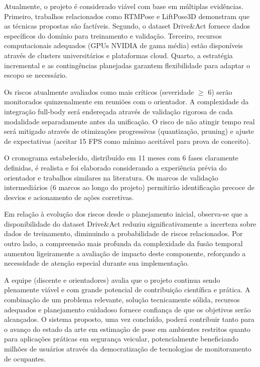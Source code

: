 \documentclass[12pt, a4paper]{article}
\begin{document}
Atualmente, o projeto é considerado viável com base em múltiplas evidências. Primeiro, trabalhos relacionados como RTMPose e LiftPose3D demonstram que as técnicas propostas são factíveis. Segundo, o dataset Drive\&Act fornece dados específicos do domínio para treinamento e validação. Terceiro, recursos computacionais adequados (GPUs NVIDIA de gama média) estão disponíveis através de clusters universitários e plataformas cloud. Quarto, a estratégia incremental e as contingências planejadas garantem flexibilidade para adaptar o escopo se necessário.

Os riscos atualmente avaliados como mais críticos (severidade $\geq$ 6) serão monitorados quinzenalmente em reuniões com o orientador. A complexidade da integração full-body será endereçada através de validação rigorosa de cada modalidade separadamente antes da unificação. O risco de não atingir tempo real será mitigado através de otimizações progressivas (quantização, pruning) e ajuste de expectativas (aceitar 15 FPS como mínimo aceitável para prova de conceito).

O cronograma estabelecido, distribuído em 11 meses com 6 fases claramente definidas, é realista e foi elaborado considerando a experiência prévia do orientador e trabalhos similares na literatura. Os marcos de validação intermediários (6 marcos ao longo do projeto) permitirão identificação precoce de desvios e acionamento de ações corretivas.

Em relação à evolução dos riscos desde o planejamento inicial, observa-se que a disponibilidade do dataset Drive\&Act reduziu significativamente a incerteza sobre dados de treinamento, diminuindo a probabilidade de riscos relacionados. Por outro lado, a compreensão mais profunda da complexidade da fusão temporal aumentou ligeiramente a avaliação de impacto deste componente, reforçando a necessidade de atenção especial durante sua implementação.

A equipe (discente e orientadores) avalia que o projeto continua sendo plenamente viável e com grande potencial de contribuição científica e prática. A combinação de um problema relevante, solução tecnicamente sólida, recursos adequados e planejamento cuidadoso fornece confiança de que os objetivos serão alcançados. O sistema proposto, uma vez concluído, poderá contribuir tanto para o avanço do estado da arte em estimação de pose em ambientes restritos quanto para aplicações práticas em segurança veicular, potencialmente beneficiando milhões de usuários através da democratização de tecnologias de monitoramento de ocupantes.
\end{document}
